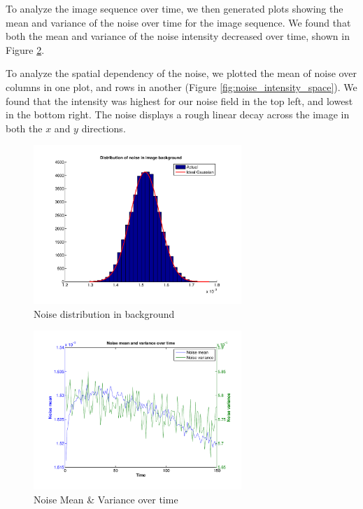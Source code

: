 \documentclass{article}
\begin{document}
To analyze the image sequence over time, we then generated plots showing the mean and variance of the noise over time for the image sequence. We found that both the mean and variance of the noise intensity decreased over time, shown in Figure \ref{fig:noise_mean_var_time}.

To analyze the spatial dependency of the noise, we plotted the mean of noise over columns in one plot, and rows in another (Figure \ref{fig:noise_intensity_space}). We found that the intensity was highest for our noise field in the top left, and lowest in the bottom right. The noise displays a rough linear decay across the image in both the $x$ and $y$ directions.

\begin{figure}[h]
\centering
\includegraphics[width=0.7\textwidth]{figures/noise_distribution.pdf}
\caption{Noise distribution in background}
\label{fig:noise_dist_background}
\end{figure}

\begin{figure}[h]
\centering
\includegraphics[width=0.7\textwidth]{figures/noise_over_time.pdf}
\caption{Noise Mean \& Variance over time}
\label{fig:noise_mean_var_time}
\end{figure}
\end{document}
